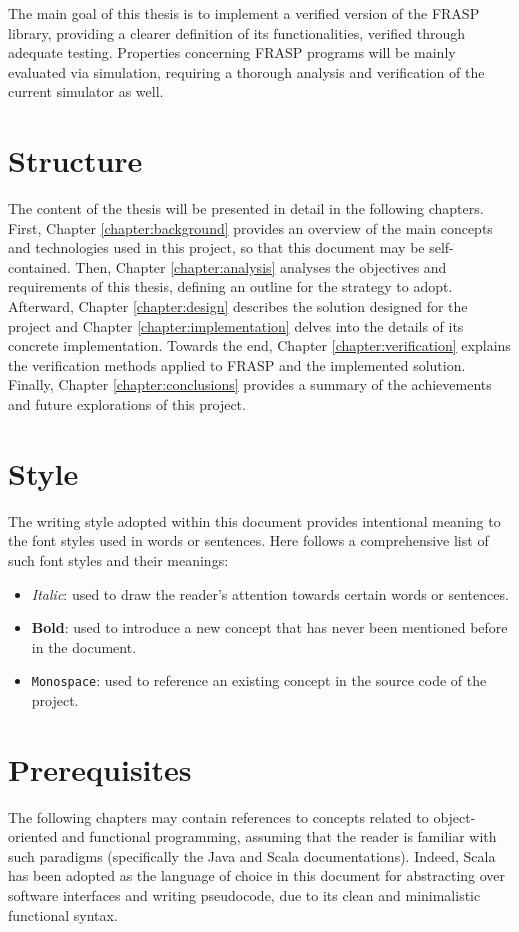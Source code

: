 The main goal of this thesis is to implement a verified version of the FRASP
library, providing a clearer definition of its functionalities, verified
through adequate testing. Properties concerning FRASP programs will be mainly
evaluated via simulation, requiring a thorough analysis and verification of the
current simulator as well.

\section{Structure}
\label{section:introduction:structure}

The content of the thesis will be presented in detail in the following
chapters. First, Chapter \ref{chapter:background} provides an overview of the
main concepts and technologies used in this project, so that this document may
be self-contained. Then, Chapter \ref{chapter:analysis} analyses the objectives
and requirements of this thesis, defining an outline for the strategy to adopt.
Afterward, Chapter \ref{chapter:design} describes the solution designed for the
project and Chapter \ref{chapter:implementation} delves into the details of its
concrete implementation. Towards the end, Chapter \ref{chapter:verification}
explains the verification methods applied to FRASP and the implemented
solution. Finally, Chapter \ref{chapter:conclusions} provides a summary of the
achievements and future explorations of this project.

\section{Style}
\label{section:introduction:style}

The writing style adopted within this document provides intentional meaning to
the font styles used in words or sentences. Here follows a comprehensive list
of such font styles and their meanings:

\begin{itemize}
  \item \textit{Italic}: used to draw the reader's attention towards certain
        words or sentences.
  \item \textbf{Bold}: used to introduce a new concept that has never been
        mentioned before in the document.
  \item \texttt{Monospace}: used to reference an existing concept in the source
        code of the project.
\end{itemize}

\section{Prerequisites}
\label{section:introduction:prerequisites}

The following chapters may contain references to concepts related to
object-orient\-ed and functional programming, assuming that the reader is
familiar with such paradigms (specifically the Java \cite{Java} and Scala
\cite{Scala} documentations). Indeed, Scala has been adopted as the language of
choice in this document for abstracting over software interfaces and writing
pseudocode, due to its clean and minimalistic functional syntax.
